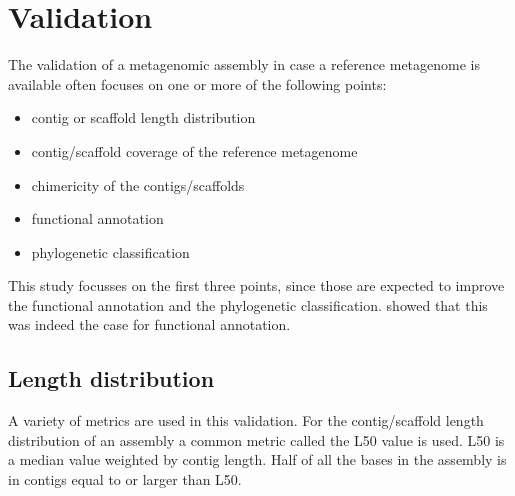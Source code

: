 \documentclass[a4paper,12pt]{report}
\begin{document}

\clearpage \section{Validation} \label{sec:metval} The validation of a metagenomic assembly in
case a reference metagenome is available often focuses on one or more of the
following points:
\begin{itemize}
\item contig or scaffold length distribution
\item contig/scaffold coverage of the reference metagenome
\item chimericity of the contigs/scaffolds
\item functional annotation
\item phylogenetic classification
\end{itemize}
This study focusses on the first three points, since those are expected to
improve the functional annotation and the phylogenetic classification.
\citet{Mende22384016} showed that this was indeed the case for functional
annotation.\\


\subsection{Length distribution}
A variety of metrics are used in this validation. For the contig/scaffold
length distribution of an assembly a common metric called the L50 value is
used. L50 is a median value weighted by contig length. Half of all the bases in
the assembly is in contigs equal to or larger than L50.
\end{document}
